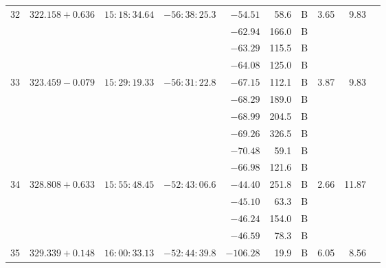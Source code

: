 {\begin{longtable}{l lll r r c rrr}
32   &  $322.158+0.636$   &  $15:18:34.64$    & $-56:38:25.3$    & $ -54.51 $ &    58.6&       B    &    3.65  &    9.83   &           \\
     &  $             $   &  $           $    & $           $    & $ -62.94 $ &   166.0&       B    &          &           &           \\
     &  $             $   &  $           $    & $           $    & $ -63.29 $ &   115.5&       B    &          &           &           \\
     &  $             $   &  $           $    & $           $    & $ -64.08 $ &   125.0&       B    &          &           &           \\
33   &  $323.459-0.079$   &  $15:29:19.33$    & $-56:31:22.8$    & $ -67.15 $ &   112.1&       B    &    3.87  &    9.83   &           \\
     &  $             $   &  $           $    & $           $    & $ -68.29 $ &   189.0&       B    &          &           &           \\
     &  $             $   &  $           $    & $           $    & $ -68.99 $ &   204.5&       B    &          &           &           \\
     &  $             $   &  $           $    & $           $    & $ -69.26 $ &   326.5&       B    &          &           &           \\
     &  $             $   &  $           $    & $           $    & $ -70.48 $ &    59.1&       B    &          &           &           \\
     &  $             $   &  $           $    & $           $    & $ -66.98 $ &   121.6&       B    &          &           &           \\
34   &  $328.808+0.633$   &  $15:55:48.45$    & $-52:43:06.6$    & $ -44.40 $ &   251.8&       B    &    2.66  &   11.87   &           \\
     &  $             $   &  $           $    & $           $    & $ -45.10 $ &    63.3&       B    &          &           &           \\
     &  $             $   &  $           $    & $           $    & $ -46.24 $ &   154.0&       B    &          &           &           \\
     &  $             $   &  $           $    & $           $    & $ -46.59 $ &    78.3&       B    &          &           &           \\
35   &  $329.339+0.148$   &  $16:00:33.13$    & $-52:44:39.8$    & $-106.28 $ &    19.9&       B    &    6.05  &    8.56   &           \\

\end{longtable}}

